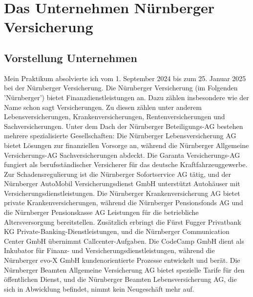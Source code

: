 \chapter{Das Unternehmen Nürnberger Versicherung}\label{ch:intro}


\section{Vorstellung Unternehmen}
Mein Praktikum absolvierte ich vom 1. September 2024 bis zum 25. Januar 2025 bei der Nürnberger Versicherung.
Die Nürnberger Versicherung (im Folgenden 'Nürnberger') bietet Finanzdienstleistungen an.
Dazu zählen insbesondere wie der Name schon sagt Versicherungen.
Zu diesen zählen unter anderem Lebensversicherungen, Krankenversicherungen, Rentenversicherungen und Sachversicherungen.
Unter dem Dach der Nürnberger Beteiligungs-AG bestehen mehrere spezialisierte Gesellschaften: Die Nürnberger Lebensversicherung AG bietet Lösungen zur finanziellen Vorsorge an, während die Nürnberger Allgemeine Versicherungs-AG Sachversicherungen abdeckt. Die Garanta Versicherungs-AG fungiert als berufsständischer Versicherer für das deutsche Kraftfahrzeuggewerbe. Zur Schadensregulierung ist die Nürnberger Sofortservice AG tätig, und der Nürnberger AutoMobil Versicherungsdienst GmbH unterstützt Autohäuser mit Versicherungsdienstleistungen. Die Nürnberger Krankenversicherung AG bietet private Krankenversicherungen, während die Nürnberger Pensionsfonds AG und die Nürnberger Pensionskasse AG Leistungen für die betriebliche Altersversorgung bereitstellen.
Zusätzlich erbringt die Fürst Fugger Privatbank KG Private-Banking-Dienstleistungen, und die Nürnberger Communication Center GmbH übernimmt Callcenter-Aufgaben. Die CodeCamp
GmbH dient als Inkubator für Finanz- und Versicherungsdienstleistungen, während die Nürnberger evo-X GmbH kundenorientierte Prozesse entwickelt und berät. Die Nürnberger Beamten Allgemeine Versicherung AG bietet spezielle Tarife für den öffentlichen Dienst, und die Nürnberger Beamten Lebensversicherung AG, die sich in Abwicklung befindet, nimmt kein Neugeschäft mehr auf.
\cite{NürnbergerWiki2024}
